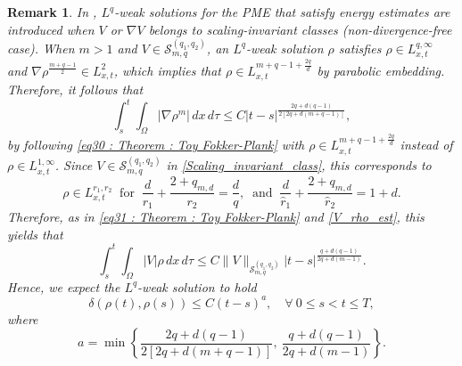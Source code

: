 \documentclass{amsart}
\newtheorem{remark}[defn]{Remark}
\numberwithin{equation}{section}
\begin{document}
\begin{remark}
In \cite[Theorem~2.4 \& 2.12]{HKK02}, \( L^q \)-weak solutions for the PME that satisfy energy estimates are introduced when \( V \) or \( \nabla V \) belongs to scaling-invariant classes (non-divergence-free case). When \( m > 1 \) and \( V \in \mathcal{S}_{m,q}^{(q_1,q_2)} \), an \( L^q \)-weak solution \( \rho \) satisfies \( \rho \in L^{q,\infty}_{x,t} \) and \( \nabla \rho^{\frac{m+q-1}{2}} \in L^{2}_{x,t} \), which implies that \( \rho \in L_{x,t}^{m+q-1+\frac{2q}{d}} \) by parabolic embedding. Therefore, it follows that 
    \[
     \int_{s}^{t} \int_{\Omega}   | \nabla  \rho^m |  \,dx\,d\tau \leq C |t-s|^{\frac{2q+d(q-1)}{2[2q+d(m+q-1)]}},
    \]
    by following \eqref{eq30 : Theorem : Toy Fokker-Plank} with $\rho \in L_{x,t}^{m+q-1+\frac{2q}{d}}$ instead of $\rho \in L^{1,\infty}_{x,t}$.
    Since $V\in \mathcal{S}_{m,q}^{(q_1,q_2)}$ in \eqref{Scaling_invariant_class}, this corresponds to 
    \[
    \rho \in L_{x,t}^{r_1,r_2}  \ \text{ for }  \  \frac{d}{r_1} + \frac{2+q_{m,d}}{r_2} = \frac{d}{q}, 
    \ \text{ and } \ 
    \frac{d}{\hat{r}_1} + \frac{2+q_{m,d}}{\hat{r}_2} = 1+d.
    \]
    Therefore, as in \eqref{eq31 : Theorem : Toy Fokker-Plank} and \eqref{V_rho_est}, this yields that 
    \[
     \int_{s}^{t} \int_{\Omega}  | V |\rho  \,dx\,d\tau \leq C\|V\|_{\mathcal{S}_{m,q}^{(q_1,q_2)}}|t-s|^{\frac{q+d(q-1)}{2q+d(m-1)}}.
    \]
    Hence, we expect the $L^q$-weak solution to hold 
	 \begin{equation*}\label{T:weakSol:Narrow_1:PME}
\delta(\rho(t),\rho(s))\leq C(t-s)^{a},   \quad  \forall ~ 0\leq s<t\leq T, 
\end{equation*}
where 
    \[
    a=\min\left\{\frac{2q+d(q-1)}{2[2q+d(m+q-1)]}, \ \frac{q+d(q-1)}{2q+d(m-1)}\right\}.
    \]
\end{remark}
\end{document}
